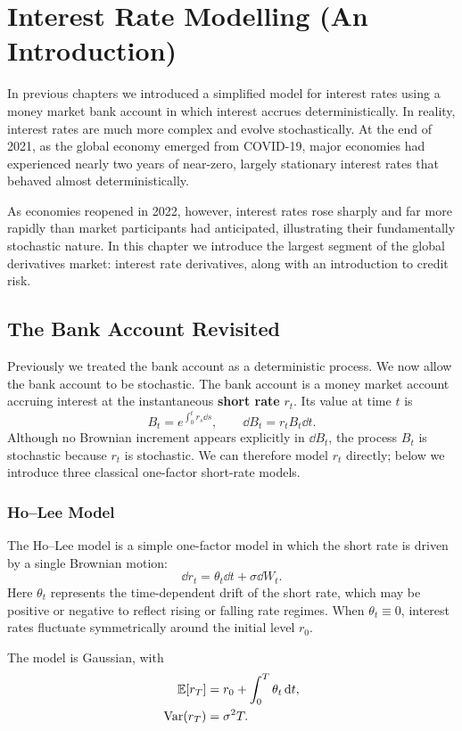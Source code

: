 \chapter{Interest Rate Modelling (An Introduction)}\label{ch:interest-rate-modelling}

In previous chapters we introduced a simplified model for interest rates using a money market bank account in which interest accrues deterministically. In reality, interest rates are much more complex and evolve stochastically. At the end of 2021, as the global economy emerged from COVID-19, major economies had experienced nearly two years of near-zero, largely stationary interest rates that behaved almost deterministically.

As economies reopened in 2022, however, interest rates rose sharply and far more rapidly than market participants had anticipated, illustrating their fundamentally stochastic nature. In this chapter we introduce the largest segment of the global derivatives market: interest rate derivatives, along with an introduction to credit risk.

\section{The Bank Account Revisited}
Previously we treated the bank account as a deterministic process. We now allow the bank account to be stochastic. The bank account is a money market account accruing interest at the instantaneous \textbf{short rate} $r_t$. Its value at time $t$ is
\[
B_t = e^{\int_0^t r_s\dd s}, \qquad \dd B_t = r_t B_t\dd t.
\]
Although no Brownian increment appears explicitly in $\dd B_t$, the process $B_t$ is stochastic because $r_t$ is stochastic. We can therefore model $r_t$ directly; below we introduce three classical one-factor short-rate models.

\subsection*{Ho--Lee Model}
The Ho--Lee model is a simple one-factor model in which the short rate is driven by a single Brownian motion:
\[
\dd r_t = \theta_t\dd t + \sigma\dd W_t.
\]
Here $\theta_t$ represents the time-dependent drift of the short rate, which may be positive or negative to reflect rising or falling rate regimes. When $\theta_t \equiv 0$, interest rates fluctuate symmetrically around the initial level $r_0$.

The model is Gaussian, with
\begin{align*}
\mathbb{E}[r_T] &= r_0 + \int_0^T \theta_t\,\mathrm{d} t, \\
\operatorname{Var}(r_T) &= \sigma^2 T.
\end{align*}


